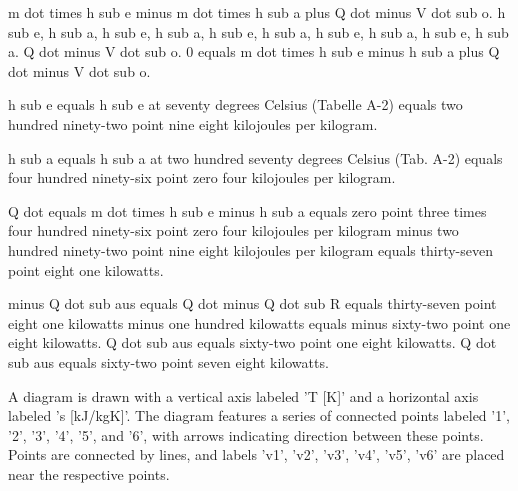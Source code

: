 m dot times h sub e minus m dot times h sub a plus Q dot minus V dot sub o. h sub e, h sub a, h sub e, h sub a, h sub e, h sub a, h sub e, h sub a, h sub e, h sub a. Q dot minus V dot sub o. 0 equals m dot times h sub e minus h sub a plus Q dot minus V dot sub o.

h sub e equals h sub e at seventy degrees Celsius (Tabelle A-2) equals two hundred ninety-two point nine eight kilojoules per kilogram.

h sub a equals h sub a at two hundred seventy degrees Celsius (Tab. A-2) equals four hundred ninety-six point zero four kilojoules per kilogram.

Q dot equals m dot times h sub e minus h sub a equals zero point three times four hundred ninety-six point zero four kilojoules per kilogram minus two hundred ninety-two point nine eight kilojoules per kilogram equals thirty-seven point eight one kilowatts.

minus Q dot sub aus equals Q dot minus Q dot sub R equals thirty-seven point eight one kilowatts minus one hundred kilowatts equals minus sixty-two point one eight kilowatts. Q dot sub aus equals sixty-two point one eight kilowatts. Q dot sub aus equals sixty-two point seven eight kilowatts.

A diagram is drawn with a vertical axis labeled 'T [K]' and a horizontal axis labeled 's [kJ/kgK]'. The diagram features a series of connected points labeled '1', '2', '3', '4', '5', and '6', with arrows indicating direction between these points. Points are connected by lines, and labels 'v1', 'v2', 'v3', 'v4', 'v5', 'v6' are placed near the respective points.